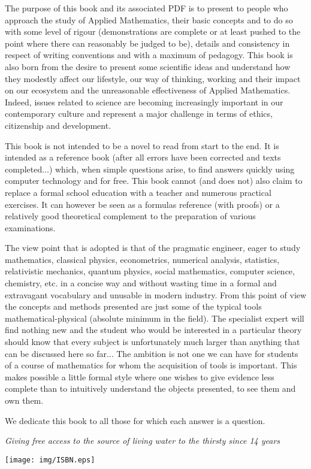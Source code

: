 \documentclass[12pt,a4paper,twoside,openright]{report}
\theoremstyle{definition}
\theoremstyle{itexmp}
\numberwithin{equation}{section}
\begin{document}
	{\color{white}The purpose of this book and its associated PDF is to present to people who approach the study of Applied Mathematics, their basic concepts and to do so with some level of rigour (demonstrations are complete or at least pushed to the point where there can reasonably be judged to be), details and consistency in respect of writing conventions and with a maximum of pedagogy. This book is also born from the desire to present some scientific ideas and understand how they modestly affect our lifestyle, our way of thinking, working and their impact on our ecosystem and the unreasonable effectiveness of Applied Mathematics. Indeed, issues related to science are becoming increasingly important in our contemporary culture and represent a major challenge in terms of ethics, citizenship and development.

	This book is not intended to be a novel to read from start to the end. It is intended as a reference book (after all errors have been corrected and texts completed...) which, when simple questions arise, to find answers quickly using computer technology and for free. This book cannot (and does not) also claim to replace a formal school education with a teacher and numerous practical exercises. It can however be seen as a formulas reference (with proofs) or a relatively good theoretical complement to the preparation of various examinations.

	The view point that is adopted is that of the pragmatic engineer, eager to study mathematics, classical physics, econometrics, numerical analysis, statistics, relativistic mechanics, quantum physics, social mathematics, computer science, chemistry, etc. in a concise way and without wasting time in a formal and extravagant vocabulary and unusable in modern industry. From this point of view the concepts and methods presented are just some of the typical tools mathematical-physical (absolute minimum in the field). The specialist expert will find nothing new and the student who would be interested in a particular theory should know that every subject is unfortunately much larger than anything that can be discussed here so far... The ambition is not one we can have for students of a course of mathematics for whom the acquisition of tools is important. This makes possible a little formal style where one wishes to give evidence less complete than to intuitively understand the objects presented, to see them and own them.

	We dedicate this book to all those for which each answer is a question.

\begin{flushright}
\textit{Giving free access to the source of living water to the thirsty since 14 years}\end{flushright}}


\begin{flushright}
\texttt{[image: img/ISBN.eps]} 
\end{flushright}
\end{document}
